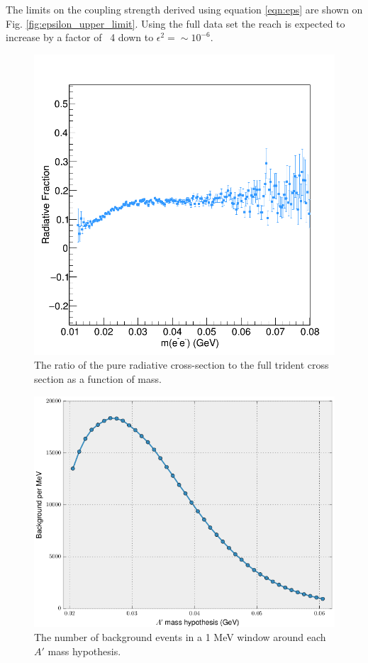 The limits on the coupling strength derived using equation \ref{eqn:eps}
are shown on Fig. \ref{fig:epsilon_upper_limit}. Using the full data set
the reach is expected to increase by a factor of ~4 down to $\epsilon^2 = \sim 10^{-6}$.
\begin{figure}[ht]
    \centering
    \includegraphics[width=.8\textwidth]{images/rad_frac.png}
    \caption{The ratio of the pure radiative cross-section to the full trident 
             cross section as a function of mass.}
    \label{fig:rad_frac}
\end{figure}
\begin{figure}[hb]
    \centering
    \includegraphics[width=\textwidth]{images/bkg_mev.png}
    \caption{The number of background events in a 1 MeV window around each $A'$ mass hypothesis.}
    \label{fig:background_mev}
\end{figure}
